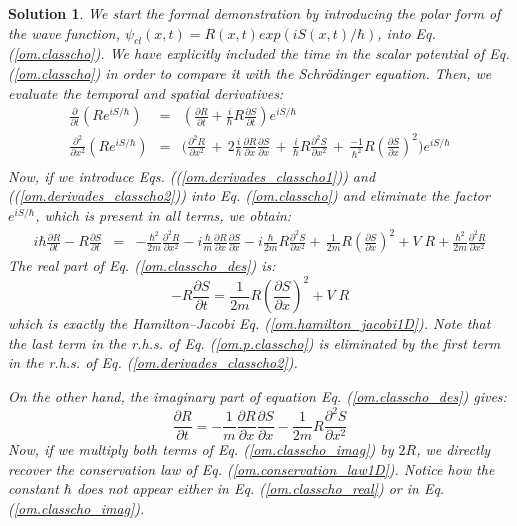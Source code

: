 \documentclass[onecolumn,nofootinbib, secnumarabic, amsmath, nobibnotes,12pt,aps,pra]{revtex4-1}
\newtheorem{solution}{Solution}
\newcommand{\pref}[1]{(\ref{#1})}
\newcommand{\eref}[1]{Eq. (\ref{#1})}
\begin{document}
\begin{solution}
We start the formal demonstration by introducing the polar form of the wave function, $\psi_{cl}(x,t) = R(x,t) exp(i S(x,t)/\hbar)$, into \eref{om.classcho}. We have explicitly included the time in the scalar potential of \eref{om.classcho} in order to compare it with the Schr\"odinger equation. Then, we evaluate the temporal and spatial derivatives:
\begin{eqnarray}
\label{om.derivades_classcho1}
\frac {\partial} {\partial t} \left(Re^{i S/\hbar}\right)& = &\left( \frac {\partial R} {\partial t} + \frac {i} {\hbar} R\frac{\partial S} {\partial t} \right)e^{i S/\hbar}\\
\label{om.derivades_classcho2}
\frac {\partial^2} {\partial x^2} \left(Re^{i S/\hbar}\right) & = &\!\Bigg( \frac {\partial^2 R} {\partial x^2} \,{+}\, 2 \frac {i} {\hbar} \frac{\partial R} {\partial x} \frac{\partial S} {\partial x} \,{+}\, \frac {i} {\hbar} R \frac{\partial^2 S} {\partial x^2} \,{+}\, \frac {-1} {\hbar^2} R \left( \frac{\partial S} {\partial x}\right)^2\! \Bigg) e^{i S/\hbar}\nonumber\\
\end{eqnarray}
Now, if we introduce Eqs. (\pref{om.derivades_classcho1}) and
(\pref{om.derivades_classcho2}) into \eref{om.classcho} and
eliminate the factor $e^{i S/\hbar}$, which is present in all terms,
we obtain:
\begin{eqnarray}
\label{om.classcho_des}
i \hbar \frac {\partial R} {\partial t} - R\frac{\partial S}
{\partial t} &=& -\frac {\hbar^2}{2m} \frac {\partial^2 R} {\partial
x^2} - i\frac {\hbar}{m} \frac{\partial R} {\partial x}
\frac{\partial S} {\partial x} - i \frac {\hbar}{2m} R
\frac{\partial^2 S} {\partial x^2} +\, \frac {1} {2m} R \left(
\frac{\partial S} {\partial x}\right)^2+ V \; R + \frac {\hbar^{2}} {2 m} \frac { {\partial}^2 R} {\partial x^2}
\end{eqnarray}
The real part of \eref{om.classcho_des} is:
\begin{equation}
\label{om.classcho_real}
 -R\frac{\partial S} {\partial t} = \frac {1} {2m} R \left( \frac{\partial S} {\partial x}\right)^2 + V \; R
\end{equation}
which is exactly the Hamilton--Jacobi \eref{om.hamilton_jacobi1D}. Note that the last term in the r.h.s. of \eref{om.p.classcho} is eliminated by the first term in the r.h.s. of \eref{om.derivades_classcho2}.

On the other hand, the imaginary part of equation \eref{om.classcho_des} gives:
\begin{equation}
\label{om.classcho_imag}
 \frac {\partial R} {\partial t} = -\frac {1}{m} \frac{\partial R} {\partial x} \frac{\partial S} {\partial x} - \frac {1}{2m} R \frac{\partial^2 S} {\partial x^2}
\end{equation}
Now, if we multiply both terms of \eref{om.classcho_imag} by $2 R$,
we directly recover the conservation law of
\eref{om.conservation_law1D}. Notice how the constant $\hbar$ does
not appear either in \eref{om.classcho_real} or in
\eref{om.classcho_imag}.
\end{solution}
\end{document}
